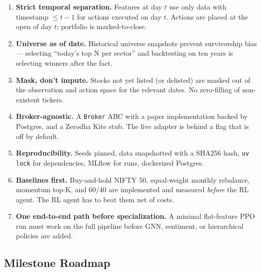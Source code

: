\documentclass[11pt,a4paper]{article}
\begin{document}
\begin{enumerate}[leftmargin=*]
\item \textbf{Strict temporal separation.} Features at day $t$ use only data with
timestamp $\le t-1$ for actions executed on day $t$. Actions are placed at the open
of day $t$; portfolio is marked-to-close.

\item \textbf{Universe as of date.} Historical universe snapshots prevent
survivorship bias --- selecting ``today's top N per sector'' and backtesting on ten
years is selecting winners after the fact.

\item \textbf{Mask, don't impute.} Stocks not yet listed (or delisted) are masked
out of the observation and action space for the relevant dates. No zero-filling
of non-existent tickers.

\item \textbf{Broker-agnostic.} A \texttt{Broker} ABC with a paper implementation
backed by Postgres, and a Zerodha Kite stub. The live adapter is behind a flag that
is off by default.

\item \textbf{Reproducibility.} Seeds pinned, data snapshotted with a SHA256 hash,
\texttt{uv lock} for dependencies, MLflow for runs, dockerized Postgres.

\item \textbf{Baselines first.} Buy-and-hold NIFTY 50, equal-weight monthly
rebalance, momentum top-K, and 60/40 are implemented and measured \emph{before}
the RL agent. The RL agent has to beat them net of costs.

\item \textbf{One end-to-end path before specialization.} A minimal flat-feature
PPO run must work on the full pipeline before GNN, sentiment, or hierarchical
policies are added.
\end{enumerate}

\subsection{Milestone Roadmap}
\end{document}
